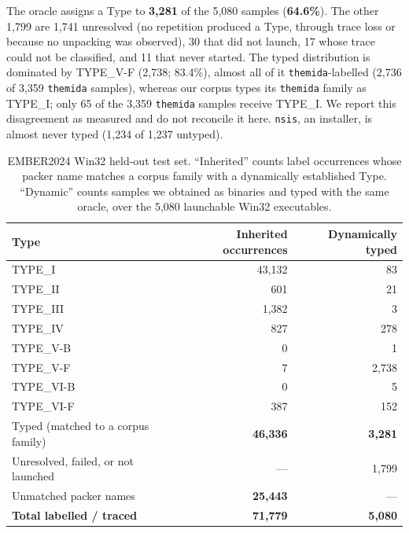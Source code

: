 The oracle assigns a Type to \textbf{3,281} of the 5,080 samples (\textbf{64.6\%}).
The other 1,799 are 1,741 unresolved (no repetition produced a Type, through trace
loss or because no unpacking was observed), 30 that did not launch, 17 whose
trace could not be classified, and 11 that never started. The typed distribution
is dominated by TYPE\_V-F (2,738; 83.4\%), almost all of it
\texttt{themida}-labelled (2,736 of 3,359 \texttt{themida} samples), whereas our
corpus types its \texttt{themida} family as TYPE\_I; only 65 of the 3,359
\texttt{themida} samples receive TYPE\_I. We report this disagreement as measured
and do not reconcile it here. \texttt{nsis}, an installer, is almost never typed
(1,234 of 1,237 untyped).

\begin{table}[t]
\centering
\caption{EMBER2024 Win32 held-out test set. ``Inherited'' counts label
occurrences whose packer name matches a corpus family with a dynamically
established Type. ``Dynamic'' counts samples we obtained as binaries and typed
with the same oracle, over the 5,080 launchable Win32 executables.}
\label{tab:ember}
\footnotesize
\begin{tabular}{@{}lrr@{}}
\toprule
Type & Inherited occurrences & Dynamically typed \\
\midrule
TYPE\_I     & 43,132 & 83 \\
TYPE\_II    &    601 & 21 \\
TYPE\_III   &  1,382 & 3 \\
TYPE\_IV    &    827 & 278 \\
TYPE\_V-B   &      0 & 1 \\
TYPE\_V-F   &      7 & 2,738 \\
TYPE\_VI-B  &      0 & 5 \\
TYPE\_VI-F  &    387 & 152 \\
\midrule
Typed (matched to a corpus family) & \textbf{46,336} & \textbf{3,281} \\
Unresolved, failed, or not launched & --- & 1,799 \\
Unmatched packer names     & \textbf{25,443} & --- \\
\midrule
\textbf{Total labelled / traced}    & \textbf{71,779} & \textbf{5,080} \\
\bottomrule
\end{tabular}
\end{table}
